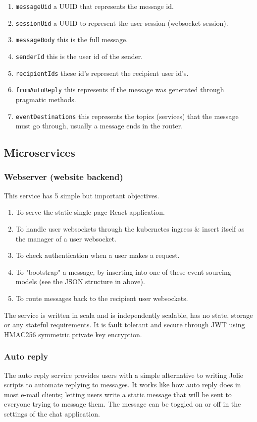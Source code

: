 \begin{enumerate}
    \item \texttt{messageUid} a UUID that represents the message id.
    \item \texttt{sessionUid} a UUID to represent the user session (websocket session).
    \item \texttt{messageBody} this is the full message.
    \item \texttt{senderId} this is the user id of the sender.
    \item \texttt{recipientIds} these id's represent the recipient user id's.
    \item \texttt{fromAutoReply} this represents if the message was generated through pragmatic methods.
    \item \texttt{eventDestinations} this represents the topics (services) that the message must go through, usually a message ends in the router.
\end{enumerate}

\subsection{Microservices}
\subsubsection{Webserver (website backend)}
This service has 5 simple but important objectives.
\begin{enumerate}
    \item To serve the static single page React application.
    \item To handle user websockets through the kubernetes ingress \& insert itself as the manager of a user websocket.
    \item To check authentication when a user makes a request.
    \item To "bootstrap" a message, by inserting into one of these event sourcing models (see the JSON structure in above).
    \item To route messages back to the recipient user websockets.
\end{enumerate}
The service is written in scala and is independently scalable, has no state, storage or any stateful requirements.
It is fault tolerant and secure through JWT using HMAC256 symmetric private key encryption.
\subsubsection{Auto reply}
The auto reply service provides users with a simple alternative to writing Jolie scripts to automate replying to messages. It works like how auto reply does in most e-mail clients; letting users write a static message that will be sent to everyone trying to message them. The message can be toggled on or off in the settings of the chat application.

